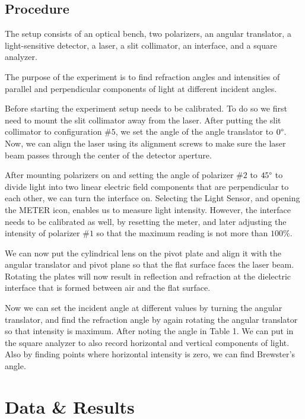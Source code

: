 \documentclass[10pt]{article}
\begin{document}
\subsection*{Procedure} 

The setup consists of an optical bench, two polarizers, an angular translator, a light-sensitive detector, a laser, a slit collimator, an interface, and a square analyzer.

The purpose of the experiment is to find refraction angles and intensities of parallel and perpendicular components of light at different incident angles.

Before starting the experiment setup needs to be calibrated. To do so we first need to mount the slit collimator away from the laser. After putting the slit collimator to configuration $\#5$, we set the angle of the angle translator to $0\degree$. Now, we can align the laser using its alignment screws to make sure the laser beam passes through the center of the detector aperture. 

After mounting polarizers on and setting the angle of polarizer $\#2$ to $45\degree$ to divide light into two linear electric field components that are perpendicular to each other, we can turn the interface on. Selecting the Light Sensor, and opening the METER icon, enables us to measure light intensity. However, the interface needs to be calibrated as well, by resetting the meter, and later adjusting the intensity of polarizer $\#1$ so that the maximum reading is not more than $100\%$.

We can now put the cylindrical lens on the pivot plate and align it with the angular translator and pivot plane so that the flat surface faces the laser beam. Rotating the plates will now result in reflection and refraction at the dielectric interface that is formed between air and the flat surface.

Now we can set the incident angle at different values by turning the angular translator, and find the refraction angle by again rotating the angular translator so that intensity is maximum. After noting the angle in Table 1. We can put in the square analyzer to also record horizontal and vertical components of light. Also by finding points where horizontal intensity is zero, we can find Brewster's angle.
 
\section{Data \& Results}
\end{document}
